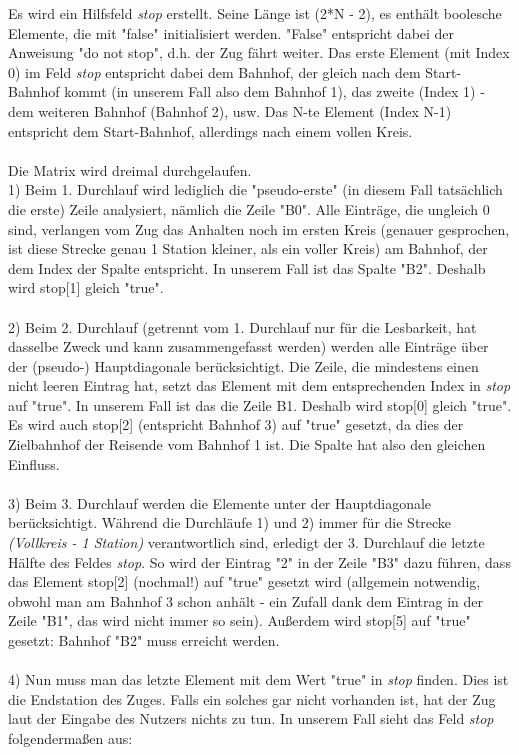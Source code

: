 Es wird ein Hilfsfeld \textit{stop} erstellt. Seine Länge ist (2*N - 2), es enthält boolesche Elemente, die mit "false" initialisiert werden. "False" entspricht dabei der Anweisung "do not stop", d.h. der Zug fährt weiter. Das erste Element (mit Index 0) im Feld \textit{stop} entspricht dabei dem Bahnhof, der gleich nach dem Start-Bahnhof kommt (in unserem Fall also dem Bahnhof 1), das zweite (Index 1) - dem weiteren Bahnhof (Bahnhof 2), usw. Das N-te Element (Index N-1) entspricht dem Start-Bahnhof, allerdings nach einem vollen Kreis.\\
\\
Die Matrix wird dreimal durchgelaufen.\\
1) Beim 1. Durchlauf wird lediglich die "pseudo-erste" (in diesem Fall tatsächlich die erste) Zeile analysiert, nämlich die Zeile "B0". Alle Einträge, die ungleich 0 sind, verlangen vom Zug das Anhalten noch im ersten Kreis (genauer gesprochen, ist diese Strecke genau 1 Station kleiner, als ein voller Kreis) am Bahnhof, der dem Index der Spalte entspricht. In unserem Fall ist das Spalte "B2". Deshalb wird stop[1] gleich "true".\\
\\
2) Beim 2. Durchlauf (getrennt vom 1. Durchlauf nur für die Lesbarkeit, hat dasselbe Zweck und kann zusammengefasst werden) werden alle Einträge über der (pseudo-) Hauptdiagonale berücksichtigt. Die Zeile, die mindestens einen nicht leeren Eintrag hat, setzt das Element mit dem entsprechenden Index in \textit{stop} auf "true". In unserem Fall ist das die Zeile B1. Deshalb wird stop[0] gleich "true". Es wird auch stop[2] (entspricht Bahnhof 3) auf "true" gesetzt, da dies der Zielbahnhof der Reisende vom Bahnhof 1 ist. Die Spalte hat also den gleichen Einfluss.\\
\\
3) Beim 3. Durchlauf werden die Elemente unter der Hauptdiagonale berücksichtigt. Während die Durchläufe 1) und 2) immer für die Strecke \textit{(Vollkreis - 1 Station)} verantwortlich sind, erledigt der 3. Durchlauf die letzte Hälfte des Feldes \textit{stop}. So wird der Eintrag "2" in der Zeile "B3" dazu führen, dass das Element stop[2] (nochmal!) auf "true" gesetzt wird (allgemein notwendig, obwohl man am Bahnhof 3 schon anhält - ein Zufall dank dem Eintrag in der Zeile "B1", das wird nicht immer so sein). Außerdem wird stop[5] auf "true" gesetzt: Bahnhof "B2" muss erreicht werden.\\
\\
4) Nun muss man das letzte Element mit dem Wert "true" in \textit{stop} finden. Dies ist die Endstation des Zuges. Falls ein solches gar nicht vorhanden ist, hat der Zug laut der Eingabe des Nutzers nichts zu tun. In unserem Fall sieht das Feld \textit{stop} folgendermaßen aus:\\
